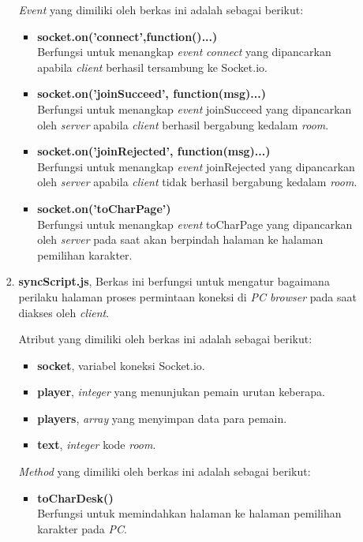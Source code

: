 \begin{enumerate}
\begin{enumerate}
\begin{enumerate}
			\textit{Event} yang dimiliki oleh berkas ini adalah sebagai berikut:
			\begin{itemize}
				\item \textbf{socket.on('connect',function(){...})} \\
				Berfungsi untuk menangkap \textit{event} \textit{connect} yang dipancarkan apabila \textit{client} berhasil tersambung ke Socket.io.
				
				\item \textbf{socket.on('joinSucceed', function(msg){...})} \\
				Berfungsi untuk menangkap \textit{event} joinSucceed yang dipancarkan oleh \textit{server} apabila \textit{client} berhasil bergabung kedalam \textit{room}.
				
				\item \textbf{socket.on('joinRejected', function(msg){...})} \\
				Berfungsi untuk menangkap \textit{event} joinRejected yang dipancarkan oleh \textit{server} apabila \textit{client} tidak berhasil bergabung kedalam \textit{room}.
				
				\item \textbf{socket.on('toCharPage')} \\
				Berfungsi untuk menangkap \textit{event} toCharPage yang dipancarkan oleh \textit{server} pada saat akan berpindah halaman ke halaman pemilihan karakter.
			\end{itemize}
			
			\item \textbf{syncScript.js}, Berkas ini berfungsi untuk mengatur bagaimana perilaku halaman proses permintaan koneksi di \textit{PC browser} pada saat diakses oleh \textit{client}.
			
			Atribut yang dimiliki oleh berkas ini adalah sebagai berikut:
			\begin{itemize}
				\item \textbf{socket}, variabel koneksi Socket.io.
				\item \textbf{player}, \textit{integer} yang menunjukan pemain urutan keberapa.
				\item \textbf{players}, \textit{array} yang menyimpan data para pemain.
				\item \textbf{text}, \textit{integer} kode \textit{room}. 
			\end{itemize}
			
			\textit{Method} yang dimiliki oleh berkas ini adalah sebagai berikut:
			\begin{itemize}
				\item \textbf{toCharDesk()} \\
				Berfungsi untuk memindahkan halaman ke halaman pemilihan karakter pada \textit{PC}.
				

\end{itemize}
\end{enumerate}
\end{enumerate}
\end{enumerate}
